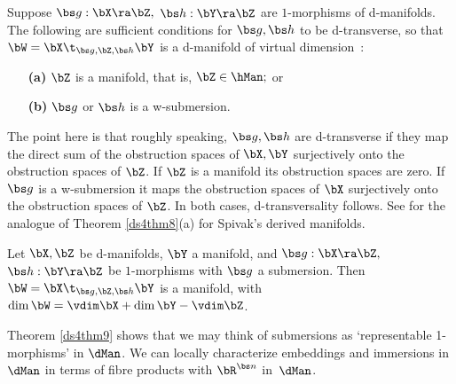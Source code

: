 \documentclass{article}
\begin{document}
\begin{thm} Suppose\/ $\bs g:\bX\ra\bZ,$ $\bs h:\bY\ra\bZ$ are
$1$-morphisms of d-manifolds. The following are sufficient
conditions for $\bs g,\bs h$ to be d-transverse, so that\/
$\bW=\bX\t_{\bs g,\bZ,\bs h}\bY$ is a d-manifold of virtual
dimension\/~{\rm{}:}
\begin{itemize}
\setlength{\itemsep}{0pt}
\setlength{\parsep}{0pt}
\item[{\bf(a)}] $\bZ$ is a manifold, that is, $\bZ\in\hMan;$ or
\item[{\bf(b)}] $\bs g$ or $\bs h$ is a
w-submersion.
\end{itemize}
\label{ds4thm8}
\end{thm}

The point here is that roughly speaking, $\bs g,\bs h$ are
d-transverse if they map the direct sum of the obstruction spaces of
$\bX,\bY$ surjectively onto the obstruction spaces of $\bZ$. If
$\bZ$ is a manifold its obstruction spaces are zero. If $\bs g$ is a
w-submersion it maps the obstruction spaces of $\bX$ surjectively
onto the obstruction spaces of $\bZ$. In both cases,
d-transversality follows. See \cite[Th.~8.15]{Spiv} for the analogue
of Theorem \ref{ds4thm8}(a) for Spivak's derived
manifolds.

\begin{thm} Let\/ $\bX,\bZ$ be d-manifolds, $\bY$ a manifold, and\/
$\bs g:\bX\ra\bZ,$ $\bs h:\bY\ra\bZ$ be $1$-morphisms with\/ $\bs g$
a submersion. Then\/ $\bW=\bX\t_{\bs g,\bZ,\bs h}\bY$ is a manifold,
with\/~$\dim\bW=\vdim\bX+\dim\bY-\vdim\bZ$.
\label{ds4thm9}
\end{thm}

Theorem \ref{ds4thm9} shows that we may think of submersions as
`representable 1-morphisms' in $\dMan$. We can locally characterize
embeddings and immersions in $\dMan$ in terms of fibre products with
$\bR^{\bs n}$ in~$\dMan$.
\end{document}

